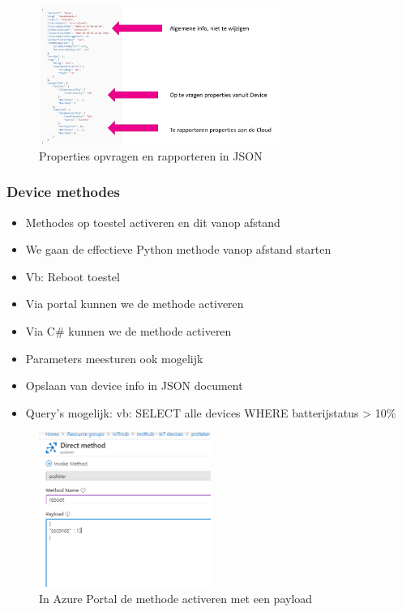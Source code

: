 \documentclass{article}
\begin{document}
\begin{figure}[H]
    \centering
    \includegraphics[width=0.7\textwidth]{iot-device-twin2.png}
    \caption{Properties opvragen en rapporteren in JSON}
\end{figure}

\subsubsection{Device methodes}

\begin{itemize}
    \item Methodes op toestel activeren en dit vanop afstand
    \item We gaan de effectieve Python methode vanop afstand starten
    \item Vb: Reboot toestel
    \item Via portal kunnen we de methode activeren
    \item Via C\# kunnen we de methode activeren
    \item Parameters meesturen ook mogelijk
    \item Opslaan van device info in JSON document
    \item Query's mogelijk: vb: SELECT alle devices WHERE batterijstatus > 10\%
\end{itemize}

\begin{figure}[H]
    \centering
    \includegraphics[width=0.5\textwidth]{iot-hub-device-direct-method-portal.png}
    \caption{In Azure Portal de methode activeren met een payload}
\end{figure}
\end{document}
